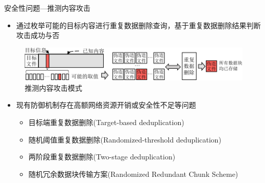 \documentclass{beamer}
\begin{document}
\begin{frame}{安全性问题—推测内容攻击}
    \begin{itemize}
        \item 通过枚举可能的目标内容进行重复数据删除查询，基于重复数据删除结果判断攻击成功与否
    \end{itemize}
    \begin{figure}[!htb]
        \small
        \centering
        \includegraphics[width=\textwidth]{./pic/LRI.pdf}
        \caption{推测内容攻击模式}
        \label{fig:LRI-mode}
    \end{figure}
    \vspace{-1em}
    \begin{itemize}
        \item 现有防御机制存在高额网络资源开销或安全性不足等问题
        \begin{itemize}
            \item 目标端重复数据删除(Target-based deduplication)
            \item 随机阈值重复数据删除(Randomized-threshold deduplication)
            \item 两阶段重复数据删除(Two-stage deduplication)
            \item 随机冗余数据块传输方案(Randomized Redundant Chunk Scheme)
    \end{itemize}
    \end{itemize}
\end{frame}
\end{document}
